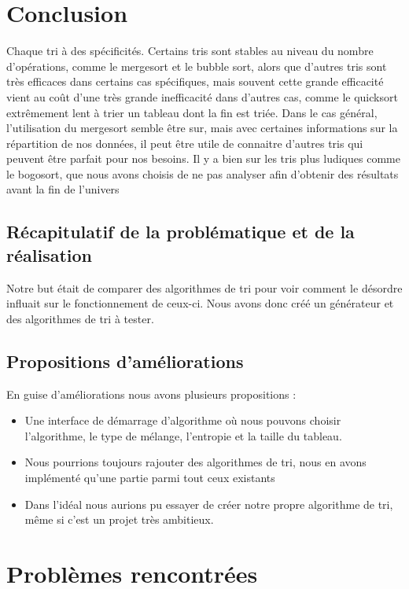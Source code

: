 \documentclass{article}
\begin{document}
\section{Conclusion}
Chaque tri à des spécificités. Certains tris sont stables au niveau du nombre d'opérations, comme le mergesort et le bubble sort, alors que d'autres tris sont très efficaces dans certains cas spécifiques, mais souvent cette grande efficacité vient au coût d'une très grande inefficacité dans d'autres cas, comme le quicksort extrêmement lent à trier un tableau dont la fin est triée.\newline
Dans le cas général, l'utilisation du mergesort semble être sur, mais avec certaines informations sur la répartition de nos données, il peut être utile de connaitre d'autres tris qui peuvent être parfait pour nos besoins.\newline
Il y a bien sur les tris plus ludiques comme le bogosort, que nous avons choisis de ne pas analyser afin d'obtenir des résultats avant la fin de l'univers

\subsection{Récapitulatif de la problématique et de la réalisation}
Notre but était de comparer des algorithmes de tri pour voir comment le désordre influait sur le fonctionnement de ceux-ci. Nous avons donc créé un générateur et des algorithmes de tri à tester.

\subsection{Propositions d'améliorations}
En guise d'améliorations nous avons plusieurs propositions : 
\begin{itemize}
    \item Une interface de démarrage d'algorithme où nous pouvons choisir l'algorithme, le type de mélange, l'entropie et la taille du tableau.  \item Nous pourrions toujours rajouter des algorithmes de tri, nous en avons implémenté qu'une partie parmi tout ceux existants
    \item Dans l'idéal nous aurions pu essayer de créer notre propre algorithme de tri, même si c'est un projet très ambitieux.
\end{itemize}
\section{Problèmes rencontrées}
\end{document}
